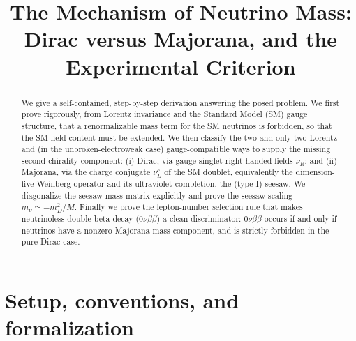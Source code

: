 \documentclass[12pt]{article}
\title{The Mechanism of Neutrino Mass: Dirac versus Majorana,
and the Experimental Criterion}
\author{}
\date{}
\theoremstyle{definition}
\newcommand{\nuL}{\nu_L}
\newcommand{\nuR}{\nu_R}
\begin{document}
\maketitle

\begin{abstract}
We give a self-contained, step-by-step derivation answering the posed
problem. We first prove rigorously, from Lorentz invariance and the
Standard Model (SM) gauge structure, that a renormalizable mass term for
the SM neutrinos is forbidden, so that the SM field content must be
extended. We then classify the two and only two Lorentz- and (in the
unbroken-electroweak case) gauge-compatible ways to supply the missing
second chirality component: (i) Dirac, via gauge-singlet right-handed
fields $\nuR$; and (ii) Majorana, via the charge conjugate $\nuL^c$
of the SM doublet, equivalently the dimension-five Weinberg operator and
its ultraviolet completion, the (type-I) seesaw. We diagonalize the
seesaw mass matrix explicitly and prove the seesaw scaling
$m_\nu \simeq -m_D^2/M$. Finally we prove the lepton-number selection
rule that makes neutrinoless double beta decay
($0\nu\beta\beta$) a clean discriminator: $0\nu\beta\beta$ occurs if and
only if neutrinos have a nonzero Majorana mass component, and is strictly
forbidden in the pure-Dirac case.
\end{abstract}

\section{Setup, conventions, and formalization}
\end{document}
